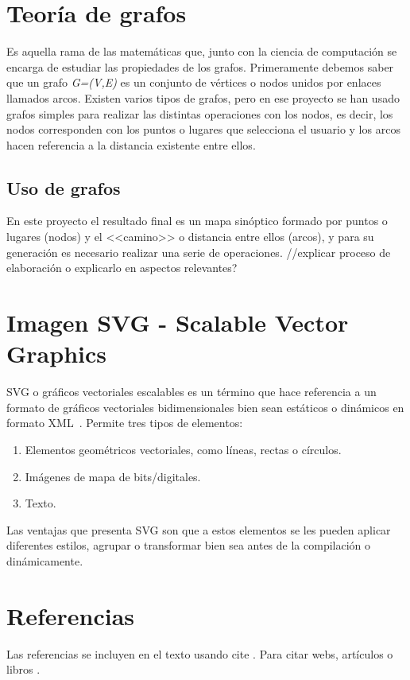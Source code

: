 \section{Teoría de grafos}
Es aquella rama de las matemáticas que, junto con la ciencia de computación se encarga de estudiar las propiedades de los grafos. Primeramente debemos saber que un grafo \textit{G=(V,E)} es un conjunto de vértices o nodos unidos por enlaces llamados arcos.
Existen varios tipos de grafos, pero en ese proyecto se han usado grafos simples para realizar las distintas operaciones con los nodos, es decir, los nodos corresponden con los puntos o lugares que selecciona el usuario y los arcos hacen referencia a la distancia existente entre ellos\cite{wiki:tgrafos}. 

\subsection{Uso de grafos}
En este proyecto el resultado final es un mapa sinóptico formado por puntos o lugares (nodos) y el <<camino>> o distancia entre ellos (arcos), y para su generación es necesario realizar una serie de operaciones. 
//explicar proceso de elaboración o explicarlo en aspectos relevantes?


\section{Imagen SVG - Scalable Vector Graphics}
SVG o gráficos vectoriales escalables es un término que hace referencia a un formato de gráficos vectoriales bidimensionales bien sean estáticos o dinámicos en formato XML~\cite{wiki:xml}.
Permite tres tipos de elementos:
\begin{enumerate}
	\item Elementos geométricos vectoriales, como líneas, rectas o círculos.
	\item Imágenes de mapa de bits/digitales.
	\item Texto.
\end{enumerate}

Las ventajas que presenta SVG son que a estos elementos se les pueden aplicar diferentes estilos, agrupar o transformar bien sea antes de la compilación o dinámicamente. 

\section{Referencias}

Las referencias se incluyen en el texto usando cite \cite{wiki:latex}. Para citar webs, artículos o libros \cite{koza92}.


